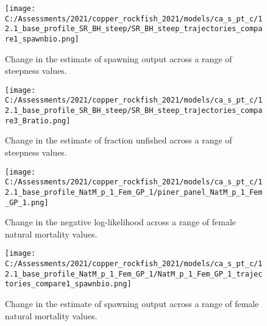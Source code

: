 \documentclass[11pt,
  english,
  a4paper,
]{article}
\begin{document}
\tagmcend\tagstructend


\begin{figure}
\centering
\texttt{[image: C:/Assessments/2021/copper\_rockfish\_2021/models/ca\_s\_pt\_c/12.1\_base\_profile\_SR\_BH\_steep/SR\_BH\_steep\_trajectories\_compare1\_spawnbio.png]}
\caption{Change in the estimate of spawning output across a range of steepness values.\label{fig:h-ssb}}
\end{figure}

\tagmcend\tagstructend


\begin{figure}
\centering
\texttt{[image: C:/Assessments/2021/copper\_rockfish\_2021/models/ca\_s\_pt\_c/12.1\_base\_profile\_SR\_BH\_steep/SR\_BH\_steep\_trajectories\_compare3\_Bratio.png]}
\caption{Change in the estimate of fraction unfished across a range of steepness values.\label{fig:h-depl}}
\end{figure}

\tagmcend\tagstructend


\begin{figure}
\centering
\texttt{[image: C:/Assessments/2021/copper\_rockfish\_2021/models/ca\_s\_pt\_c/12.1\_base\_profile\_NatM\_p\_1\_Fem\_GP\_1/piner\_panel\_NatM\_p\_1\_Fem\_GP\_1.png]}
\caption{Change in the negative log-likelihood across a range of female natural mortality values.\label{fig:m-profile}}
\end{figure}

\tagmcend\tagstructend


\begin{figure}
\centering
\texttt{[image: C:/Assessments/2021/copper\_rockfish\_2021/models/ca\_s\_pt\_c/12.1\_base\_profile\_NatM\_p\_1\_Fem\_GP\_1/NatM\_p\_1\_Fem\_GP\_1\_trajectories\_compare1\_spawnbio.png]}
\caption{Change in the estimate of spawning output across a range of female natural mortality values.\label{fig:m-ssb}}
\end{figure}
\end{document}
